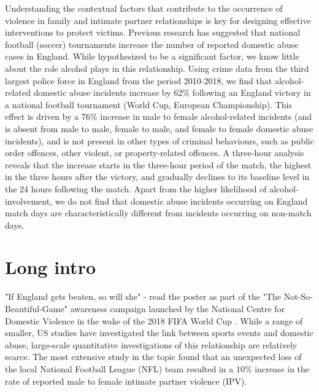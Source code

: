 \documentclass[12pt, letterpaper]{article}
\begin{document}
Understanding the contextual factors that contribute to the occurrence of violence in family and intimate partner relationships is key for designing effective interventions to protect victims. Previous research has suggested that national football (soccer) tournaments increase the number of reported domestic abuse cases in England\autocite{Kirby2014, Brimicombe2012}. While hypothesized to be a significant factor, we know little about the role alcohol plays in this relationship. Using crime data from the third largest police force in England from the period 2010-2018, we find that alcohol-related domestic abuse incidents increase by 62\% following an England victory in a national football tournament (World Cup, European Championship). This effect is driven by a 76\% increase in male to female alcohol-related incidents (and is absent from male to male, female to male, and female to female domestic abuse incidents), and is not present in other types of criminal behaviours, such as public order offences, other violent, or property-related offences. A three-hour analysis reveals that the increase starts in the three-hour period of the match, the highest in the three hours after the victory, and gradually declines to its baseline level in the 24 hours following the match. Apart from the higher likelihood of alcohol-involvement, we do not find that domestic abuse incidents occurring on England match days are characteristically different from incidents occurring on non-match days.


\section{Long intro}

"If England gets beaten, so will she" - read the poster as part of the "The Not-So-Beautiful-Game" awareness campaign launched by the National Centre for Domestic Violence in the wake of the 2018 FIFA World Cup \autocite{NCDV}. While a range of smaller, US studies have investigated the link between sports events and domestic abuse\autocite{Williams2014}, large-scale quantitative investigations of this relationship are relatively scarce. The most extensive study in the topic found that an unexpected loss of the local National Football League (NFL) team resulted in a 10\% increase in the rate of reported male to female intimate partner violence (IPV)\autocite{Card2011}. 
\end{document}
